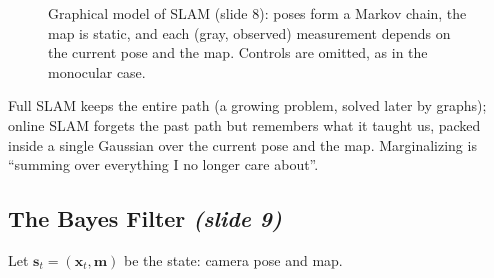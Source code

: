 \documentclass[11pt,a4paper]{article}
\newcommand{\slrs}[1]{\texorpdfstring{\emph{(slide #1)}}{(slide #1)}}
\newcommand{\bx}{\bm{x}}
\newcommand{\bz}{\bm{z}}
\newcommand{\bs}{\mathbf{s}}
\newcommand{\x}{{\bm{x}}}
\theoremstyle{definition}
\theoremstyle{plain}
\theoremstyle{remark}
\begin{document}
\begin{figure}[htbp]\centering
{}
\caption{Graphical model of SLAM (slide 8): poses form a Markov chain, the map is static, and each (gray, observed) measurement depends on the current pose and the map. Controls are omitted, as in the monocular case.}
\end{figure}
\begin{intuition}
Full SLAM keeps the entire path (a growing problem, solved later by graphs); online SLAM forgets the past path but remembers what it taught us, packed inside a single Gaussian over the current pose and the map. Marginalizing is ``summing over everything I no longer care about''.
\end{intuition}

\subsection{The Bayes Filter \slrs{9}}
Let $\bs_t=(\bx_t,\mathbf{m})$ be the state: camera pose and map.
\end{document}
